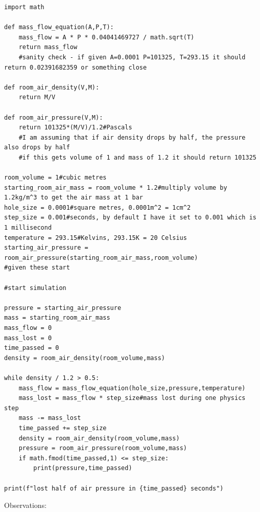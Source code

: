\documentclass[a4paper]{article}
\begin{document}
	\begin{lstlisting}
import math

def mass_flow_equation(A,P,T):
    mass_flow = A * P * 0.04041469727 / math.sqrt(T)
    return mass_flow
    #sanity check - if given A=0.0001 P=101325, T=293.15 it should return 0.02391682359 or something close

def room_air_density(V,M):
    return M/V

def room_air_pressure(V,M):
    return 101325*(M/V)/1.2#Pascals
    #I am assuming that if air density drops by half, the pressure also drops by half
    #if this gets volume of 1 and mass of 1.2 it should return 101325

room_volume = 1#cubic metres
starting_room_air_mass = room_volume * 1.2#multiply volume by 1.2kg/m^3 to get the air mass at 1 bar
hole_size = 0.0001#square metres, 0.0001m^2 = 1cm^2
step_size = 0.001#seconds, by default I have it set to 0.001 which is 1 millisecond
temperature = 293.15#Kelvins, 293.15K = 20 Celsius
starting_air_pressure = room_air_pressure(starting_room_air_mass,room_volume)
#given these start

#start simulation

pressure = starting_air_pressure
mass = starting_room_air_mass
mass_flow = 0
mass_lost = 0
time_passed = 0
density = room_air_density(room_volume,mass)

while density / 1.2 > 0.5:
    mass_flow = mass_flow_equation(hole_size,pressure,temperature)
    mass_lost = mass_flow * step_size#mass lost during one physics step
    mass -= mass_lost
    time_passed += step_size
    density = room_air_density(room_volume,mass)
    pressure = room_air_pressure(room_volume,mass)
    if math.fmod(time_passed,1) <= step_size:
        print(pressure,time_passed)

print(f"lost half of air pressure in {time_passed} seconds")
	\end{lstlisting}
	
    Observations:
    
\end{document}
